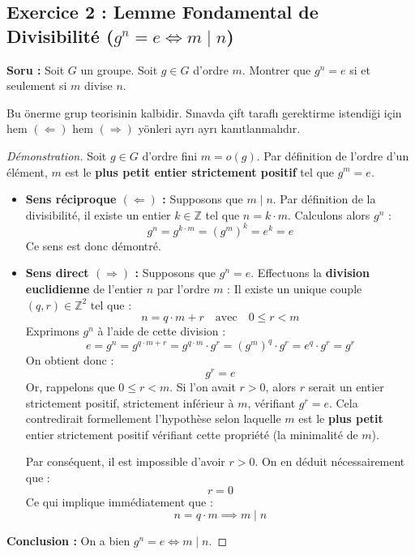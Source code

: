 \documentclass[12pt,a4paper]{report}
\begin{document}
\vspace{0.5cm}

\subsection*{Exercice 2 : Lemme Fondamental de Divisibilité ($g^n = e \iff m \mid n$)}
\textbf{Soru :} Soit $G$ un groupe. Soit $g \in G$ d'ordre $m$. Montrer que $g^n = e$ si et seulement si $m$ divise $n$.

\begin{tcolorbox}[colback=red!5!white,colframe=red!75!black,title=Sınav Notu : Her İki Yönlü İspat (Équivalence $\iff$)]
Bu önerme grup teorisinin kalbidir. Sınavda çift taraflı gerektirme istendiği için hem $(\Longleftarrow)$ hem $(\Longrightarrow)$ yönleri ayrı ayrı kanıtlanmalıdır.
\end{tcolorbox}

\begin{proof}[Démonstration]
Soit $g \in G$ d'ordre fini $m = o(g)$. Par définition de l'ordre d'un élément, $m$ est le \textbf{plus petit entier strictement positif} tel que $g^m = e$.

\begin{itemize}
    \item \textbf{Sens réciproque $(\Longleftarrow)$ :} Supposons que $m \mid n$.
    Par définition de la divisibilité, il existe un entier $k \in \mathbb{Z}$ tel que $n = k \cdot m$.
    Calculons alors $g^n$ :
    \[ g^n = g^{k \cdot m} = (g^m)^k = e^k = e \]
    Ce sens est donc démontré.

    \item \textbf{Sens direct $(\Longrightarrow)$ :} Supposons que $g^n = e$.
    Effectuons la \textbf{division euclidienne} de l'entier $n$ par l'ordre $m$ :
    Il existe un unique couple $(q, r) \in \mathbb{Z}^2$ tel que :
    \[ n = q \cdot m + r \quad \text{avec} \quad 0 \leq r < m \]
    Exprimons $g^n$ à l'aide de cette division :
    \[ e = g^n = g^{q \cdot m + r} = g^{q \cdot m} \cdot g^r = (g^m)^q \cdot g^r = e^q \cdot g^r = g^r \]
    On obtient donc :
    \[ g^r = e \]
    Or, rappelons que $0 \leq r < m$.
    Si l'on avait $r > 0$, alors $r$ serait un entier strictement positif, strictement inférieur à $m$, vérifiant $g^r = e$. 
    Cela contredirait formellement l'hypothèse selon laquelle $m$ est le \textbf{plus petit} entier strictement positif vérifiant cette propriété (la minimalité de $m$).
    
    Par conséquent, il est impossible d'avoir $r > 0$. On en déduit nécessairement que :
    \[ r = 0 \]
    Ce qui implique immédiatement que :
    \[ n = q \cdot m \implies m \mid n \]
\end{itemize}
\textbf{Conclusion :} On a bien $g^n = e \iff m \mid n$.
\end{proof}
\end{document}
